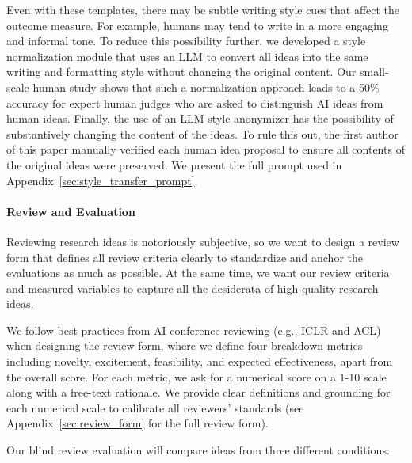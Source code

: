 Even with these templates, there may be subtle writing style cues that affect the outcome measure. For example, humans may tend to write in a more engaging and informal tone. To reduce this possibility further, we developed a style normalization module that uses an LLM to convert all ideas into the same writing and formatting style without changing the original content.
Our small-scale human study shows that such a normalization approach leads to a 50\% accuracy for expert human judges who are asked to distinguish AI ideas from human ideas.
Finally, the use of an LLM style anonymizer has the possibility of substantively changing the content of the ideas. To rule this out, the first author of this paper manually verified each human idea proposal to ensure all contents of the original ideas were preserved. 
We present the full prompt used in Appendix~\ref{sec:style_transfer_prompt}.

\paragraph*{Review and Evaluation}
Reviewing research ideas is notoriously subjective, so we want to design a review form that defines all review criteria clearly to standardize and anchor the evaluations as much as possible. At the same time, we want our review criteria and measured variables to capture all the desiderata of high-quality research ideas.

We follow best practices from AI conference reviewing (e.g., ICLR and ACL) when designing the review form, where we define four breakdown metrics including novelty, excitement, feasibility, and expected effectiveness, apart from the overall score. For each metric, we ask for a numerical score on a 1-10 scale along with a free-text rationale. We provide clear definitions and grounding for each numerical scale to calibrate all reviewers' standards (see Appendix~\ref{sec:review_form} for the full review form). 

Our blind review evaluation will compare ideas from three different conditions: 

